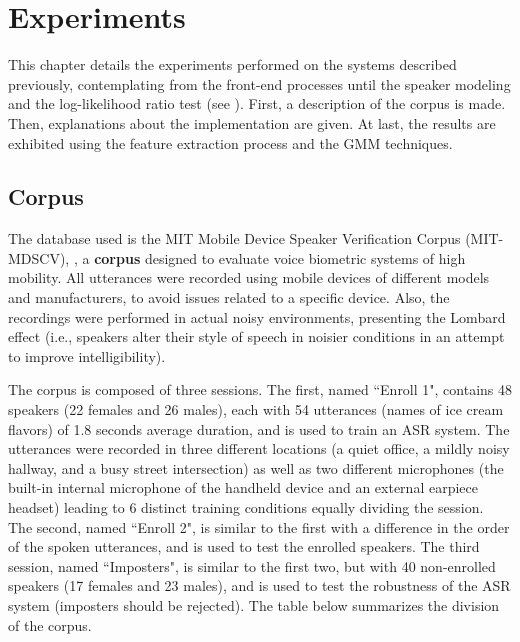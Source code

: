 \chapter{Experiments}
\label{ch:experiments}

This chapter details the experiments performed on the systems described previously, contemplating from the front-end processes until the speaker modeling and the log-likelihood ratio test (see ). First, a description of the corpus is made. Then, explanations about the implementation are given. At last, the results are exhibited using the feature extraction process and the GMM techniques.

\section{Corpus}
\label{sec:corpus}

The database used is the MIT Mobile Device Speaker Verification Corpus (MIT-MDSCV), , a \textbf{corpus} designed to evaluate voice biometric systems of high mobility. All utterances were recorded using mobile devices of different models and manufacturers, to avoid issues related to a specific device. Also, the recordings were performed in actual noisy environments, presenting the Lombard effect (i.e., speakers alter their style of speech in noisier conditions in an attempt to improve intelligibility).

The corpus is composed of three sessions. The first, named ``Enroll 1", contains 48 speakers (22 females and 26 males), each with 54 utterances (names of ice cream flavors) of 1.8 seconds average duration, and is used to train an ASR system. The utterances were recorded in three different locations (a quiet office, a mildly noisy hallway, and a busy street intersection) as well as two different microphones (the built-in internal microphone of the handheld device and an external earpiece headset) leading to 6 distinct training conditions equally dividing the session. The second, named ``Enroll 2", is similar to the first with a difference in the order of the spoken utterances, and is used to test the enrolled speakers. The third session, named ``Imposters", is similar to the first two, but with 40 non-enrolled speakers (17 females and 23 males), and is used to test the robustness of the ASR system (imposters should be rejected). The table below summarizes the division of the corpus.


